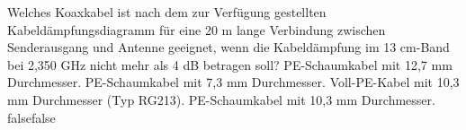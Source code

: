     {Welches Koaxkabel ist nach dem zur Verfügung gestellten Kabeldämpfungsdiagramm für eine 20 m lange Verbindung zwischen Senderausgang und Antenne geeignet, wenn die Kabeldämpfung im 13 cm-Band bei 2,350 GHz nicht mehr als 4 dB betragen soll?}
    {PE-Schaumkabel mit 12,7 mm Durchmesser.}
    {PE-Schaumkabel mit 7,3 mm Durchmesser.}
    {Voll-PE-Kabel mit 10,3 mm Durchmesser (Typ RG213).
}
    {PE-Schaumkabel mit 10,3 mm Durchmesser.}
    {false}{false}